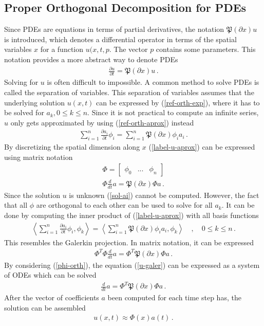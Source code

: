 \subsection{Proper Orthogonal Decomposition for PDEs}
Since PDEs are equations in terms of partial derivatives, the notation \(\mathfrak{P}(\partial x) u\) is introduced, which denotes a differential operator in terms of the spatial variables \(x\) for a function \(u(x,t,p\).
The vector \(p\) contains some parameters.
This notation provides a more abstract way to denote PDEs \cite{Gustafsson2011f}
\begin{gather}
\frac{\partial u}{\partial t} = \mathfrak{P}(\partial x) u \,.
\end{gather}
Solving for \(u\) is often difficult to impossible.
A common method to solve PDEs is called the separation of variables.
This separation of variables assumes that the underlying solution \(u(x, t)\) can be expressed by (\ref{ref-orth-exp}), where it has to be solved for \(a_k, 0 \leq k \leq n\).
Since it is not practical to compute an infinite series, \(u\) only gets approximated by using (\ref{ref-orth-aprox}) instead
\begin{gather}
\sum_{i = 1} ^{n} \frac{\partial a_i}{\partial t} \phi_i = \sum_{i = 1} ^{n} \mathfrak{P}(\partial x) \phi_i a_i \,. \label{label-u-aprox} 
\end{gather}
By discretizing the spatial dimension along \(x\) (\ref{label-u-aprox}) can be expressed using matrix notation
\begin{gather}
\Phi = \begin{bmatrix}
\phi_0 & ... & \phi_n
\end{bmatrix} \label{mat-phi}\\
\Phi \frac{d}{dt}a = \mathfrak{P}(\partial x) \Phi a \,.
\end{gather}
Since the solution \(u\) is unknown (\ref{sol-ai}) cannot be computed.
However, the fact that all \(\phi\) are orthogonal to each other can be used to solve for all \(a_k\).
It can be done by computing the inner product of (\ref{label-u-aprox}) with all basis functions
\begin{gather}
\left\langle \sum_{i = 1} ^{n} \frac{\partial a_i}{\partial t} \phi_i, \phi_k \right\rangle = \left\langle\sum_{i = 1} ^{n} \mathfrak{P}(\partial x) \phi_i a_i, \phi_k \right\rangle \quad, \quad 0 \leq k \leq n \,. \label{u-galer}
\end{gather}
This resembles the Galerkin projection.
In matrix notation, it can be expressed
\begin{gather}
\Phi^{T}\Phi \frac{d}{dt}a = \Phi^{T}\mathfrak{P}(\partial x) \Phi a \,.
\end{gather}
By considering (\ref{phi-orth}), the equation (\ref{u-galer}) can be expressed as a system of ODEs which can be solved
\begin{gather}
\frac{d}{dt} a = \Phi^{T}\mathfrak{P}(\partial x) \Phi a \,.
\end{gather}
After the vector of coefficients \(a\) been computed for each time step has, the solution can be assembled \cite{brunton_kutz_2019c}
\begin{gather}
u(x, t) \approx \Phi(x)a(t) \,. \label{u-aprox-pod}
\end{gather} 
